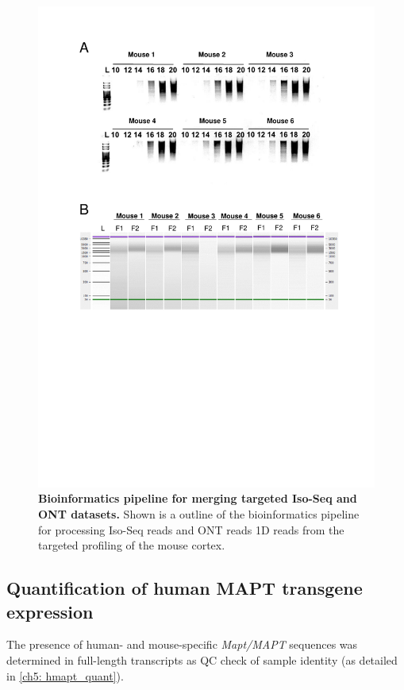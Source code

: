 \begin{figure}[htp]
	\centering
	\includegraphics[page=5,trim={0.5cm 7cm 0cm 0cm},clip,scale = 0.8]{Figures/TargetedTranscriptome_LabResults}
	\captionsetup{width=0.95\textwidth,singlelinecheck=off}
	\caption[Bioinformatics pipeline for merging targeted Iso-Seq and ONT datasets]%
	{\textbf{Bioinformatics pipeline for merging targeted Iso-Seq and ONT datasets.} Shown is a outline of the bioinformatics pipeline for processing Iso-Seq reads and ONT reads 1D reads from the targeted profiling of the mouse cortex. 
	}
	\label{fig:Targeted_bioinformatics_pipeline}
\end{figure}

\subsection{Quantification of human MAPT transgene expression} 
The presence of human- and mouse-specific \textit{Mapt/MAPT} sequences was determined in full-length transcripts as QC check of sample identity (as detailed in \cref{ch5: hmapt_quant}). 

